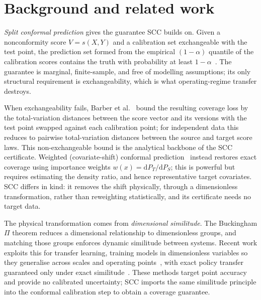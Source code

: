 \section{Background and related work}\label{sec:background}
\emph{Split conformal prediction} gives the guarantee SCC builds on. Given a nonconformity score
$V=s(X,Y)$ and a calibration set exchangeable with the test point, the prediction set formed from
the empirical $(1-\alpha)$ quantile of the calibration scores contains the truth with probability at
least $1-\alpha$~\cite{papadopoulos2002inductive,lei2018distribution}. The guarantee is marginal,
finite-sample, and free of modelling assumptions; its only structural requirement is
exchangeability, which is what operating-regime transfer destroys.

When exchangeability fails, Barber et al.~\cite{barber2023conformal} bound the resulting coverage
loss by the total-variation distances between the score vector and its versions with the test point
swapped against each calibration point; for independent data this reduces to pairwise
total-variation distances between the source and target score laws. This non-exchangeable bound is
the analytical backbone of the SCC certificate. Weighted (covariate-shift) conformal
prediction~\cite{tibshirani2019conformal} instead restores exact coverage using importance weights
$w(x)=\mathrm{d}P_T/\mathrm{d}P_S$; this is powerful but requires estimating the density ratio, and
hence representative target covariates. SCC differs in kind: it removes the shift physically, through
a dimensionless transformation, rather than reweighting statistically, and its certificate needs no
target data.

The physical transformation comes from \emph{dimensional similitude}. The Buckingham $\Pi$ theorem
reduces a dimensional relationship to dimensionless groups, and matching those groups enforces
dynamic similitude between systems. Recent work exploits this for transfer learning, training models
in dimensionless variables so they generalise across scales and operating
points~\cite{oppenheimer2023multiscale,therrien2024buckingham}, with exact policy transfer
guaranteed only under exact similitude~\cite{girard2024dimensionless}. These methods target point
accuracy and provide no calibrated uncertainty; SCC imports the same similitude principle into the
conformal calibration step to obtain a coverage guarantee.

